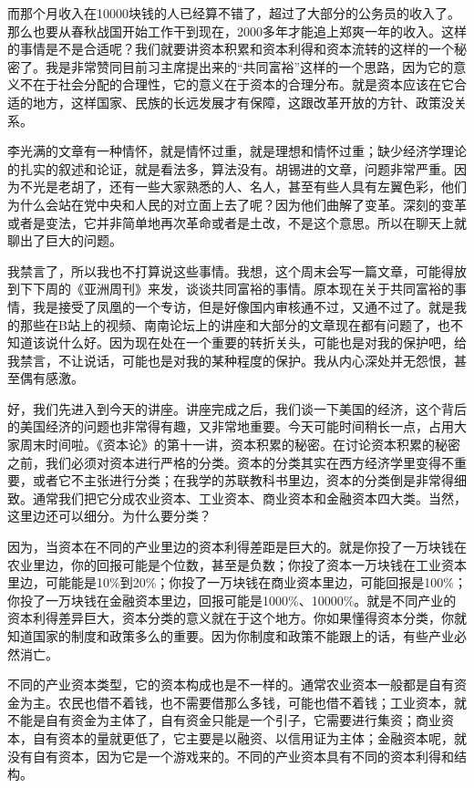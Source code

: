 \documentclass[UTF8, 12pt, a4paper]{ctexrep}
\begin{document}
而那个月收入在10000块钱的人已经算不错了，超过了大部分的公务员的收入了。那么也要从春秋战国开始工作干到现在，2000多年才能追上郑爽一年的收入。这样的事情是不是合适呢？我们就要讲资本积累和资本利得和资本流转的这样的一个秘密了。我是非常赞同目前习主席提出来的“共同富裕”这样的一个思路，因为它的意义不在于社会分配的合理性，它的意义在于资本的合理分布。就是资本应该在它合适的地方，这样国家、民族的长远发展才有保障，这跟改革开放的方针、政策没关系。

李光满的文章有一种情怀，就是情怀过重，就是理想和情怀过重；缺少经济学理论的扎实的叙述和论证，就是看法多，算法没有。胡锡进的文章，问题非常严重。因为不光是老胡了，还有一些大家熟悉的人、名人，甚至有些人具有左翼色彩，他们为什么会站在党中央和人民的对立面上去了呢？因为他们曲解了变革。深刻的变革或者是变法，它并非简单地再次革命或者是土改，不是这个意思。所以在聊天上就聊出了巨大的问题。

我禁言了，所以我也不打算说这些事情。我想，这个周末会写一篇文章，可能得放到下下周的《亚洲周刊》来发，谈谈共同富裕的事情。原本现在关于共同富裕的事情，我是接受了凤凰的一个专访，但是好像国内审核通不过，又通不过了。就是我的那些在B站上的视频、南南论坛上的讲座和大部分的文章现在都有问题了，也不知道该说什么好。因为现在处在一个重要的转折关头，可能也是对我的保护吧，给我禁言，不让说话，可能也是对我的某种程度的保护。我从内心深处并无怨恨，甚至偶有感激。

好，我们先进入到今天的讲座。讲座完成之后，我们谈一下美国的经济，这个背后的美国经济的问题也非常得有趣，又非常地重要。今天可能时间稍长一点，占用大家周末时间啦。《资本论》的第十一讲，资本积累的秘密。在讨论资本积累的秘密之前，我们必须对资本进行严格的分类。资本的分类其实在西方经济学里变得不重要，或者它不主张进行分类；在我学的苏联教科书里边，资本的分类倒是非常得细致。通常我们把它分成农业资本、工业资本、商业资本和金融资本四大类。当然，这里边还可以细分。为什么要分类？

因为，当资本在不同的产业里边的资本利得差距是巨大的。就是你投了一万块钱在农业里边，你的回报可能是个位数，甚至是负数；你投了资本一万块钱在工业资本里边，可能能是10\%到20\%；你投了一万块钱在商业资本里边，可能回报是100\%；你投了一万块钱在金融资本里边，回报可能是1000\%、10000\%。就是不同产业的资本利得差异巨大，资本分类的意义就在于这个地方。你如果懂得资本分类，你就知道国家的制度和政策多么的重要。因为你制度和政策不能跟上的话，有些产业必然消亡。

不同的产业资本类型，它的资本构成也是不一样的。通常农业资本一般都是自有资金为主。农民也借不着钱，也不需要借那么多钱，可能也借不着钱；工业资本，就不能是自有资金为主体了，自有资金只能是一个引子，它需要进行集资；商业资本，自有资本的量就更低了，它主要是以融资、以信用证为主体；金融资本呢，就没有自有资本，因为它是一个游戏来的。不同的产业资本具有不同的资本利得和结构。
\end{document}
